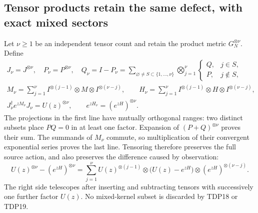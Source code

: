 \subsection{Tensor products retain the same defect, with exact mixed sectors}

Let $\nu\ge1$ be an independent tensor count and retain the product
metric $G_N^{\otimes\nu}$. Define
\begin{equation}\tag{TDP18}
\begin{gathered}
J_\nu=J^{\otimes\nu},\quad P_\nu=P^{\otimes\nu},\quad
Q_\nu=I-P_\nu
 =\sum_{\varnothing\ne S\subset\{1,\ldots,\nu\}}
 \bigotimes_{j=1}^{\nu}\begin{cases}Q,&j\in S,\\P,&j\notin S,
 \end{cases}\\
M_\nu=\sum_{j=1}^\nu I^{\otimes(j-1)}\otimes M\otimes
 I^{\otimes(\nu-j)},\qquad H_\nu=\sum_{j=1}^\nu
 I^{\otimes(j-1)}\otimes H\otimes I^{\otimes(\nu-j)},\\
J_\nu^\dagger e^{zM_\nu}J_\nu=U(z)^{\otimes\nu},\qquad
e^{zH_\nu}=(e^{zH})^{\otimes\nu}.
\end{gathered}
\end{equation}
The projections in the first line have mutually orthogonal ranges:
two distinct subsets place $PQ=0$ in at least one factor. Expansion of
$(P+Q)^{\otimes\nu}$ proves their sum. The summands of $M_\nu$ commute,
so multiplication of their convergent exponential series proves the
last line. Tensoring therefore preserves the full source action, and
also preserves the difference caused by observation:
\begin{equation}\tag{TDP19}
U(z)^{\otimes\nu}-(e^{zH})^{\otimes\nu}
 =\sum_{j=1}^\nu U(z)^{\otimes(j-1)}\otimes
 \bigl(U(z)-e^{zH}\bigr)\otimes(e^{zH})^{\otimes(\nu-j)}.
\end{equation}
The right side telescopes after inserting and subtracting tensors with
successively one further factor $U(z)$. No mixed-kernel subset is
discarded by TDP18 or TDP19.

